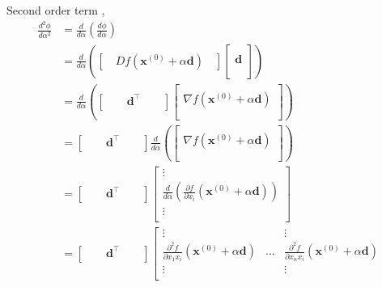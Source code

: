 \documentclass[12pt,thmsa]{article}
\begin{document}
	Second order term ,
	\[ \begin{aligned} \frac{d^{2} \phi}{d \alpha^{2}}
		& = \frac{d}{d \alpha}\left( \frac{d \phi}{d \alpha} \right) \\
		& = \frac{d}{d \alpha} \left( \left[ \quad D f\left( \boldsymbol{x}^{(0)} + \alpha \boldsymbol{d} \right) \quad \right] 
		\left[\begin{array}{c} \\ \boldsymbol{d} \\ \\ \end{array}\right] 
		\right) \\
		& = \frac{d}{d \alpha} \left( \left[ \qquad \boldsymbol{d}^{\top}  \qquad \right] 
		\left[\begin{array}{c} \\ \nabla f\left( \boldsymbol{x}^{(0)} + \alpha \boldsymbol{d} \right) \\ \\ \end{array}\right] 
		\right) \\
		& = \left[  \qquad \boldsymbol{d}^{\top} \qquad   \right]
		\frac{d}{d \alpha} \left(  
		\left[\begin{array}{c} \\ \nabla f\left( \boldsymbol{x}^{(0)} + \alpha \boldsymbol{d} \right) \\ \\ \end{array}\right] 
		\right) \\
		& = \left[  \qquad \boldsymbol{d}^{\top} \qquad   \right]  
		\left[\begin{array}{c} 
			\vdots \\ 
			\frac{d}{d \alpha} \left( \frac{\partial f}{\partial x_i}\left( \boldsymbol{x}^{(0)} + \alpha \boldsymbol{d} \right) \right) \\ 
			\vdots \\ 
		\end{array}\right]  \\
		& = \left[  \qquad \boldsymbol{d}^{\top} \qquad   \right]  
		\left[\begin{array}{ccc} 
			\vdots & & \vdots \\ 
			\frac{\partial^2 f}{\partial x_1 x_i}\left( \boldsymbol{x}^{(0)} + \alpha \boldsymbol{d} \right) & \dots & \frac{\partial^2 f}{\partial x_n x_i}\left( \boldsymbol{x}^{(0)} + \alpha \boldsymbol{d} \right)   \\ 
			\vdots & & \vdots \\ 

\end{array}
\end{aligned}\]
\end{document}
